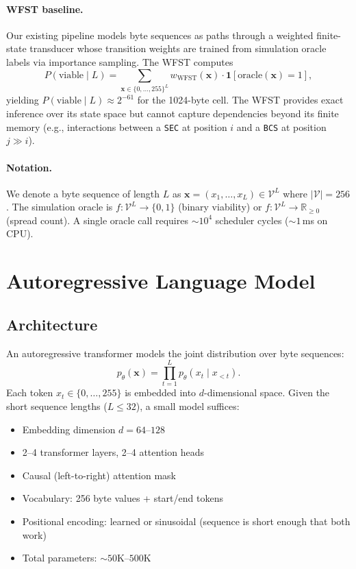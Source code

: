 \documentclass{article}
\newcommand{\opcode}[1]{\texttt{#1}}
\begin{document}
\paragraph{WFST baseline.}
Our existing pipeline models byte sequences as paths through a weighted
finite-state transducer whose transition weights are trained from simulation
oracle labels via importance sampling.  The WFST computes
\begin{equation}
  P(\text{viable} \mid L) = \sum_{\mathbf{x} \in \{0,\ldots,255\}^L}
    w_{\text{WFST}}(\mathbf{x}) \cdot \mathbf{1}[\text{oracle}(\mathbf{x})=1],
  \label{eq:wfst-prob}
\end{equation}
yielding $P(\text{viable} \mid L) \approx 2^{-61}$ for the 1024-byte cell.
The WFST provides exact inference over its state space but cannot capture
dependencies beyond its finite memory (e.g., interactions between a \opcode{SEC}
at position $i$ and a \opcode{BCS} at position $j \gg i$).

\paragraph{Notation.}
We denote a byte sequence of length $L$ as
$\mathbf{x} = (x_1, \ldots, x_L) \in \mathcal{V}^L$ where $|\mathcal{V}|=256$.
The simulation oracle is $f:\mathcal{V}^L \to \{0,1\}$ (binary viability)
or $f:\mathcal{V}^L \to \mathbb{R}_{\geq 0}$ (spread count).
A single oracle call requires ${\sim}10^4$ scheduler cycles (${\sim}1$\,ms on CPU).


\section{Autoregressive Language Model}
\label{sec:lm}

\subsection{Architecture}

An autoregressive transformer models the joint distribution over byte sequences:
\begin{equation}
  p_\theta(\mathbf{x}) = \prod_{t=1}^{L} p_\theta(x_t \mid x_{<t}).
  \label{eq:ar}
\end{equation}
Each token $x_t \in \{0,\ldots,255\}$ is embedded into $d$-dimensional space.
Given the short sequence lengths ($L \leq 32$), a small model suffices:
\begin{itemize}
  \item Embedding dimension $d = 64$--$128$
  \item 2--4 transformer layers, 2--4 attention heads
  \item Causal (left-to-right) attention mask
  \item Vocabulary: 256 byte values + start/end tokens
  \item Positional encoding: learned or sinusoidal (sequence is short enough
        that both work)
  \item Total parameters: ${\sim}50$K--$500$K
\end{itemize}
\end{document}
